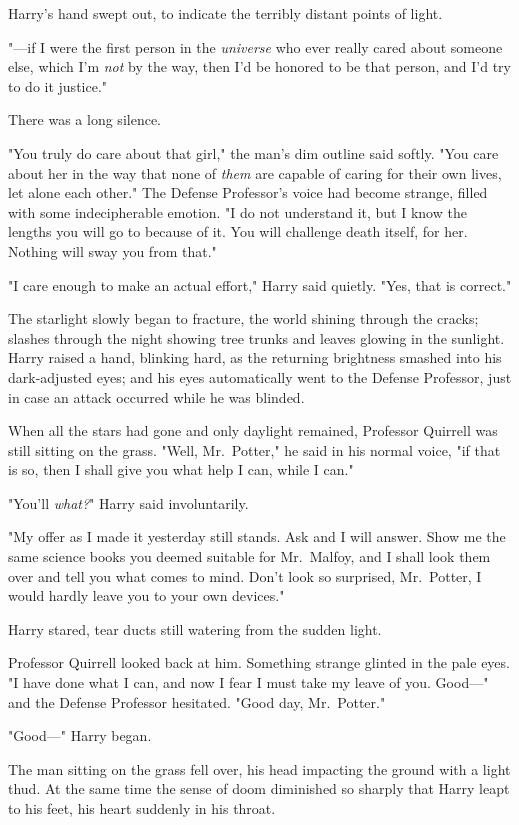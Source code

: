 Harry's hand swept out, to indicate the terribly distant points of light.

"---if I were the first person in the \emph{universe} who ever really cared
about someone else, which I'm \emph{not} by the way, then I'd be honored to be
that person, and I'd try to do it justice."

There was a long silence.

"You truly do care about that girl," the man's dim outline said softly. "You
care about her in the way that none of \emph{them} are capable of caring for
their own lives, let alone each other." The Defense Professor's voice had
become strange, filled with some indecipherable emotion. "I do not understand
it, but I know the lengths you will go to because of it. You will challenge
death itself, for her. Nothing will sway you from that."

"I care enough to make an actual effort," Harry said quietly. "Yes, that is
correct."

The starlight slowly began to fracture, the world shining through the cracks;
slashes through the night showing tree trunks and leaves glowing in the
sunlight. Harry raised a hand, blinking hard, as the returning brightness
smashed into his dark-adjusted eyes; and his eyes automatically went to the
Defense Professor, just in case an attack occurred while he was blinded.

When all the stars had gone and only daylight remained, Professor Quirrell was
still sitting on the grass. "Well, Mr.~Potter," he said in his normal voice,
"if that is so, then I shall give you what help I can, while I can."

"You'll \emph{what?}" Harry said involuntarily.

"My offer as I made it yesterday still stands. Ask and I will answer. Show me
the same science books you deemed suitable for Mr.~Malfoy, and I shall look
them over and tell you what comes to mind. Don't look so surprised, Mr.~Potter,
I would hardly leave you to your own devices."

Harry stared, tear ducts still watering from the sudden light.

Professor Quirrell looked back at him. Something strange glinted in the pale
eyes. "I have done what I can, and now I fear I must take my leave of you.
Good\mbox{---}" and the Defense Professor hesitated. "Good day, Mr.~Potter."

"Good\mbox{---}" Harry began.

The man sitting on the grass fell over, his head impacting the ground with a
light thud. At the same time the sense of doom diminished so sharply that Harry
leapt to his feet, his heart suddenly in his throat.

